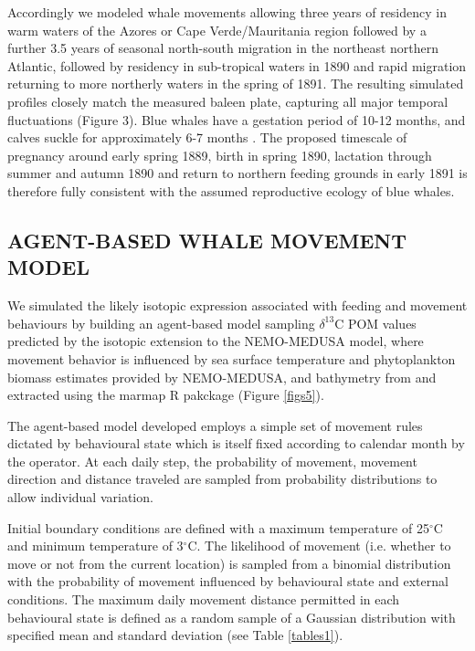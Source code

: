 \documentclass[a4paper,10pt]{article}
\begin{document}
Accordingly we modeled whale movements allowing three years of residency in warm waters of the Azores or Cape Verde/Mauritania region followed by a further 3.5 years of seasonal north-south migration in the northeast northern Atlantic, followed by residency in sub-tropical waters in 1890 and rapid migration returning to more northerly waters in the spring of 1891. 
The resulting simulated profiles closely match the measured baleen plate, capturing all major temporal fluctuations (Figure 3). 
Blue whales have a gestation period of 10-12 months, and calves suckle for approximately 6-7 months \cite{handbook}. 
The proposed timescale of pregnancy around early spring 1889, birth in spring 1890, lactation through summer and autumn 1890 and return to northern feeding grounds in early 1891 is therefore fully consistent with the assumed reproductive ecology of blue whales.

\subsection*{AGENT-BASED WHALE MOVEMENT MODEL}
We simulated the likely isotopic expression associated with feeding and movement behaviours by building an agent-based model sampling $\delta^{13}$C POM values predicted by the isotopic extension to the NEMO-MEDUSA model\cite{magozzi2017using,yool2013medusa}, where movement behavior is influenced by sea surface temperature and phytoplankton biomass estimates provided by NEMO-MEDUSA\cite{yool2013medusa}, and bathymetry from\cite{bathy} and extracted using the marmap R pakckage\cite{marmap} (Figure \ref{figs5}).
 
The agent-based model developed employs a simple set of movement rules dictated by behavioural state which is itself fixed according to calendar month by the operator. 
At each daily step, the probability of movement, movement direction and distance traveled are sampled from probability distributions to allow individual variation.

Initial boundary conditions are defined with a maximum temperature of 25$^{\circ}$C and minimum temperature of 3$^{\circ}$C. 
The likelihood of movement (i.e. whether to move or not from the current location) is sampled from a binomial distribution with the probability of movement influenced by behavioural state and external conditions. 
The maximum daily movement distance permitted in each behavioural state is defined as a random sample of a Gaussian distribution with specified mean and standard deviation (see Table \ref{tables1}).
 
\end{document}
